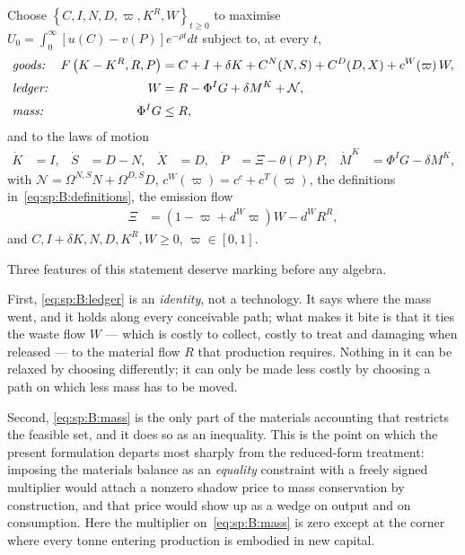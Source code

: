 \begin{problem}\label{prob:sp:B}
Choose $\left\{C,I,N,D,\varpi,K^R,W\right\}_{t\ge0}$ to maximise
$U_0=\int_0^\infty\left[u(C)-v(P)\right]e^{-\rho t}dt$ subject to, at every $t$,
\begin{align}
&\text{\emph{goods:}}
&
F\left(K-K^R,R,P\right) &= C+I+\delta K+C^N(N,S)+C^D(D,X)+c^W\!\left(\varpi\right)W,
\label{eq:sp:B:goods}
\\[0.2em]
&\text{\emph{ledger:}}
&
W &= R-\Phi^I G+\delta M^K+\mathcal N,
\label{eq:sp:B:ledger}
\\[0.2em]
&\text{\emph{mass:}}
&
\Phi^I G &\le R,
\label{eq:sp:B:mass}
\end{align}
and to the laws of motion
\begin{align}
\dot K &= I,
&
\dot S &= D-N,
&
\dot X &= D,
&
\dot P &= \Xi-\theta(P)P,
&
\dot M^K &= \Phi^I G-\delta M^K,
\label{eq:sp:B:states-motion}
\end{align}
with $\mathcal N=\Omega^{N,S}N+\Omega^{D,S}D$, $c^W(\varpi)=c^c+c^T(\varpi)$, the definitions
in~\eqref{eq:sp:B:definitions}, the emission flow
\begin{align}
\Xi &= \left(1-\varpi+d^W\varpi\right)W-d^WR^R,
\label{eq:sp:B:Xi}
\end{align}
and $C,I+\delta K,N,D,K^R,W\ge0$, $\varpi\in\left[0,1\right]$.
\end{problem}

Three features of this statement deserve marking before any algebra.

First, \eqref{eq:sp:B:ledger} is an \emph{identity}, not a technology. It says where the mass went, and
it holds along every conceivable path; what makes it bite is that it ties the waste flow $W$ --- which
is costly to collect, costly to treat and damaging when released --- to the material flow $R$ that
production requires. Nothing in it can be relaxed by choosing differently; it can only be made less
costly by choosing a path on which less mass has to be moved.

Second, \eqref{eq:sp:B:mass} is the only part of the materials accounting that restricts the feasible
set, and it does so as an inequality. This is the point on which the present formulation departs most
sharply from the reduced-form treatment: imposing the materials balance as an \emph{equality}
constraint with a freely signed multiplier would attach a nonzero shadow price to mass conservation by
construction, and that price would show up as a wedge on output and on consumption. Here the multiplier
on~\eqref{eq:sp:B:mass} is zero except at the corner where every tonne entering production is embodied
in new capital.

